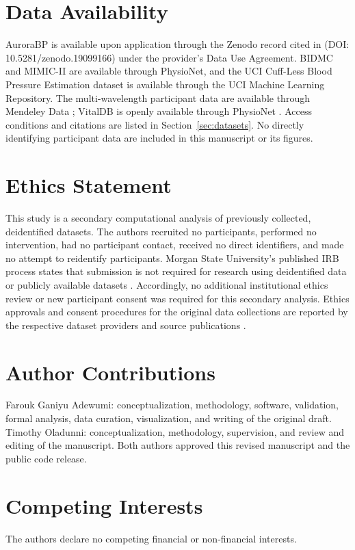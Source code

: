 \documentclass[journal]{IEEEtran}
\begin{document}
\section*{Data Availability}
AuroraBP is available upon application through the Zenodo record cited in \cite{aurorabpDataset} (DOI: 10.5281/zenodo.19099166) under the provider's Data Use Agreement. BIDMC and MIMIC-II are available through PhysioNet, and the UCI Cuff-Less Blood Pressure Estimation dataset is available through the UCI Machine Learning Repository. The multi-wavelength participant data are available through Mendeley Data \cite{appel2025ppg}; VitalDB is openly available through PhysioNet \cite{vitaldbDataset}. Access conditions and citations are listed in Section~\ref{sec:datasets}. No directly identifying participant data are included in this manuscript or its figures.
\section*{Ethics Statement}
This study is a secondary computational analysis of previously collected, deidentified datasets. The authors recruited no participants, performed no intervention, had no participant contact, received no direct identifiers, and made no attempt to reidentify participants. Morgan State University's published IRB process states that submission is not required for research using deidentified data or publicly available datasets \cite{morganIRB2023}. Accordingly, no additional institutional ethics review or new participant consent was required for this secondary analysis. Ethics approvals and consent procedures for the original data collections are reported by the respective dataset providers and source publications \cite{aurorabp2022,aurorabpDataset,pimentel2017,appel2025ppg,lee2022vitaldb,vitaldbDataset}.
\section*{Author Contributions}
Farouk Ganiyu Adewumi: conceptualization, methodology, software, validation, formal analysis, data curation, visualization, and writing of the original draft. Timothy Oladunni: conceptualization, methodology, supervision, and review and editing of the manuscript. Both authors approved this revised manuscript and the public code release.
\section*{Competing Interests}
The authors declare no competing financial or non-financial interests.
\end{document}
